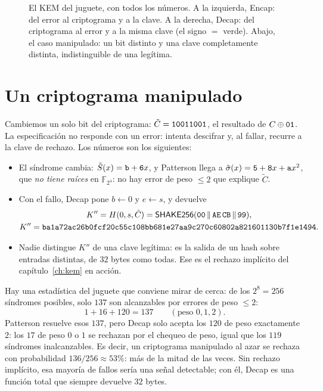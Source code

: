 \documentclass[11pt,a4paper,oneside]{report}
\newcommand{\F}{\mathbb{F}}
\newcommand{\FF}[1]{\F_{2^{#1}}}
\newcommand{\hx}[1]{\text{\texttt{#1}}}
\begin{document}
\begin{figure}[htbp]
\caption{El KEM del juguete, con todos los números. A la izquierda,
\textsf{Encap}: del error al criptograma y a la clave. A la derecha,
\textsf{Decap}: del criptograma al error y a la misma clave (el signo
$=$ verde). Abajo, el caso manipulado: un bit distinto y una clave
completamente distinta, indistinguible de una legítima.}
\label{fig:labkem-pipeline}
\end{figure}

\section{Un criptograma manipulado}

Cambiemos un solo bit del criptograma: $\tilde{C}=\hx{10011001}$, el
resultado de $C\oplus\hx{01}$. La especificación no responde con un
error: intenta descifrar y, al fallar, recurre a la clave de rechazo.
Los números son los siguientes:

\begin{itemize}[leftmargin=1.5em,itemsep=2pt]
  \item El síndrome cambia: $\tilde{S}(x)=\hx b+\hx6x$, y Patterson llega a
        $\tilde{\sigma}(x)=\hx5+\hx8x+\hx a x^2$, que \emph{no tiene raíces} en
        $\FF4$: no hay error de peso $\le2$ que explique $\tilde{C}$.
  \item Con el fallo, \textsf{Decap} pone $b\leftarrow0$ y
        $e\leftarrow s$, y devuelve
        \[
          \begin{gathered}
            K''=H(0,s,\tilde{C})=\textsf{SHAKE256}(\hx{00}\,\|\,\hx{AE\,CB}\,\|\,\hx{99}),\\
            K''=\hx{ba1a72ac26b0fcf20c55c108bb681e27aa9c270c60802a821601130b7f1e1494}.
          \end{gathered}
        \]
  \item Nadie distingue $K''$ de una clave legítima: es la salida de un
        hash sobre entradas distintas, de $32$ bytes como todas. Ese es
        el rechazo implícito del capítulo~\ref{ch:kem} en acción.
\end{itemize}

Hay una estadística del juguete que conviene mirar de cerca: de los
$2^8=256$ síndromes posibles, solo $137$ son alcanzables por errores de
peso $\le2$:
\[
  1+16+120=137
  \qquad(\text{peso }0,1,2).
\]
Patterson resuelve esos $137$, pero \textsf{Decap} solo acepta los
$120$ de peso exactamente $2$: los $17$ de peso $0$ o $1$ se rechazan
por el chequeo de peso, igual que los $119$ síndromes inalcanzables.
Es decir, un criptograma manipulado al azar se rechaza con
probabilidad $136/256\approx53\%$: más de la mitad de las veces. Sin
rechazo implícito, esa mayoría de fallos sería una señal detectable;
con él, \textsf{Decap} es una función total que siempre devuelve $32$
bytes.
\end{document}
